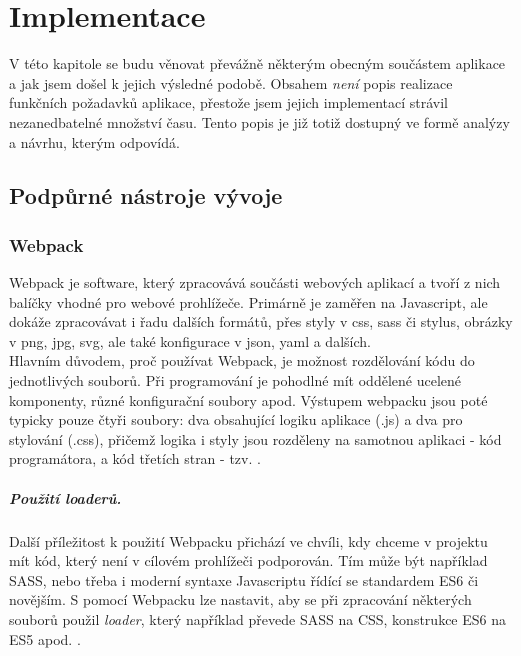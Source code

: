 \chapter{Implementace}\label{implementation}

V této kapitole se budu věnovat převážně některým obecným součástem aplikace a jak jsem došel k jejich výsledné podobě. Obsahem \emph{není} popis realizace funkčních požadavků aplikace, přestože jsem jejich implementací strávil nezanedbatelné množství času. Tento popis je již totiž dostupný ve formě analýzy a návrhu, kterým odpovídá.\\


\section{Podpůrné nástroje vývoje}

\subsection{Webpack}

Webpack \cite{webpack} je software, který zpracovává součásti webových aplikací a tvoří z nich balíčky vhodné pro webové prohlížeče. Primárně je zaměřen na Javascript, ale dokáže zpracovávat i řadu dalších formátů, přes styly v css, sass či stylus, obrázky v png, jpg, svg, ale také konfigurace v json, yaml a dalších.\\
Hlavním důvodem, proč používat Webpack, je možnost rozdělování kódu do jednotlivých souborů. Při programování je pohodlné mít oddělené ucelené komponenty, různé konfigurační soubory apod. Výstupem webpacku jsou poté typicky pouze čtyři soubory: dva obsahující logiku aplikace (.js) a dva pro stylování (.css), přičemž logika i styly jsou rozděleny na samotnou aplikaci - kód programátora, a kód třetích stran - tzv. .

\paragraph{Použití loaderů.} Další příležitost k použití Webpacku přichází ve chvíli, kdy chceme v projektu mít kód, který není v cílovém prohlížeči podporován. Tím může být například SASS, nebo třeba i moderní syntaxe Javascriptu řídící se standardem ES6 či novějším. S pomocí Webpacku lze nastavit, aby se při zpracování některých souborů použil \emph{loader}, který například převede SASS na CSS, konstrukce ES6 na ES5 apod. \cite{webpack-ackee}.

